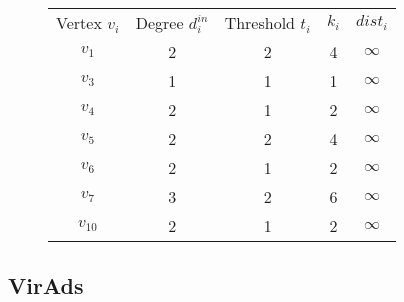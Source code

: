 \begin{figure}
\begin{minipage}{0.45\textwidth}
\end{minipage}
\begin{minipage}{0.45\textwidth}

    \begin{tabular}{c c c c c}
		Vertex $v_{i}$ & Degree $d^{in}_{i}$ & Threshold $t_{i}$& $k_{i}$ & $dist_{i}$\\
		$v_{1}$ & 2 & 2 & 4 & $\infty$ \\
		$v_{3}$ & 1 & 1 & 1 & $\infty$\\
		$v_{4}$ & 2 & 1 & 2 & $\infty$\\
		$v_{5}$ & 2 & 2 & 4 & $\infty$\\
		$v_{6}$ & 2 & 1 & 2 & $\infty$\\
		$v_{7}$ & 3 & 2 & 6 & $\infty$\\
		$v_{10}$ & 2 & 1 & 2 & $\infty$\\
	\end{tabular}
\end{minipage}
\end{figure}

\subsection{VirAds} 



